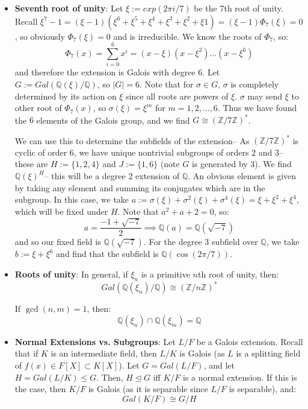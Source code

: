 \documentclass[11pt, oneside]{amsart}   	%
\theoremstyle{definition}
\begin{document}
\begin{itemize}

	\item \textbf{Seventh root of unity}: Let $\xi := exp(2\pi i / 7)$ be the 7th root of unity. Recall $\xi^7 - 1 = (\xi - 1)(\xi^6 + \xi^5 + \xi^4 + \xi^3 + \xi^2 + \xi 
	1) = (\xi - 1)\Phi_7(\xi) = 0$, so obviously $\Phi_7(\xi) = 0$ and is irreducible. We know the roots of $\Phi_7$, so:
	$$
		\Phi_7(x) = \sum_{i = 0}^6 x^i = (x - \xi)(x - \xi^2)...(x - \xi^6)
	$$
	and therefore the extension is Galois with degree $6$. Let $G := Gal(\mathbb Q(\xi) / \mathbb Q)$, so $|G| = 6$. Note that for $\sigma\in G$, $\sigma$ 
	is completely determined by its action on $\xi$ since all roots are powers of $\xi$. $\sigma$ may send $\xi$ to other root of $\Phi_7(x)$, so $\sigma(\xi) 
	= \xi^m$ for $m = 1, 2, ..., 6$. Thus we have found the $6$ elements of the Galois group, and we find $G \cong (\mathbb Z / 7\mathbb Z)^*$. 
	
	We can use this to determine the subfields of the extension-- As $(\mathbb Z / 7\mathbb Z)^*$ is cyclic of order 6, we have unique nontrivial subgroups 
	of orders $2$ and $3$-- these are $H := \{1, 2, 4\}$ and $J := \{1, 6\}$ (note $G$ is generated by 3). We find $\mathbb Q(\xi)^H$-- this will be a degree 
	2 extension of $\mathbb Q$. An obvious element is given by taking any element and summing its conjugates which are in the subgroup. In this case, 
	we take $a := \sigma(\xi) + \sigma^2(\xi) + \sigma^4(\xi) = \xi + \xi^2 + \xi^4$, which will be fixed under $H$. Note that $a^2 + a + 2 = 0$, so:
	$$
		a = \frac{-1 + \sqrt{-7}}{2} \implies \mathbb Q(a) = \mathbb Q(\sqrt{-7})
	$$
	and so our fixed field is $\mathbb Q(\sqrt{-7})$. For the degree 3 subfield over $\mathbb Q$, we take $b := \xi + \xi^6$ and find that the subfield is 
	$\mathbb Q(\cos (2\pi / 7))$. 
	
	\item \textbf{Roots of unity}: In general, if $\xi_n$ is a primitive $n$th root of unity, then:
	$$
		Gal(\mathbb Q(\xi_n) / \mathbb Q)\cong (\mathbb Z / n\mathbb Z)^*
	$$
	
	If $\gcd(n, m) = 1$, then:
	$$
		\mathbb Q(\xi_n)\cap\mathbb Q(\xi_m) = \mathbb Q
	$$
	
	\item \textbf{Normal Extensions vs. Subgroups}: Let $L / F$ be a Galois extension. Recall that if $K$ is an intermediate field, then $L / K$ is Galois 
	(as $L$ is a splitting field of $f(x)\in F[X]\subset K[X]$). Let $G = Gal(L / F)$, and let $H = Gal(L / K)\leq G$. Then, $H\trianglelefteq G$ iff $K / F$ 
	is a normal extension. If this is the case, then $K / F$ is Galois (as it is separable since $L / F$ is separable), and:
	$$
		Gal(K / F) \cong G / H
	$$
	

\end{itemize}
\end{document}
